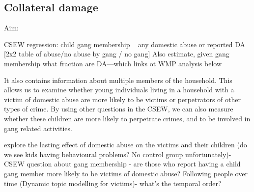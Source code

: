 \documentclass[11pt, a4paper]{article}
\begin{document}


%
%
%
%


\newpage

\subsection*{Collateral damage}

Aim:

CSEW regression: child gang membership ~ any domestic abuse or reported DA [2x2 table of abuse/no abuse by gang / no gang]
Also estimate, given gang membership what fraction are DA---which links ot WMP analysis below

It also contains information about  multiple members of the household. This allows us to examine whether young individuals living in a household with a victim of domestic abuse are more likely to be victims or perpetrators of other types of crime. By using other questions in the CSEW, we can also measure whether these children are more likely to perpetrate crimes, and to be involved in gang related activities.
 
 explore the lasting effect of domestic abuse on the victims and their children (do we see kids having behavioural problems? No control group unfortunately)- CSEW question about gang membership - are those who report having a child gang member more likely to be victims of domestic abuse? Following people over time (Dynamic topic modelling for victims)- what’s the temporal order? 
\end{document}
